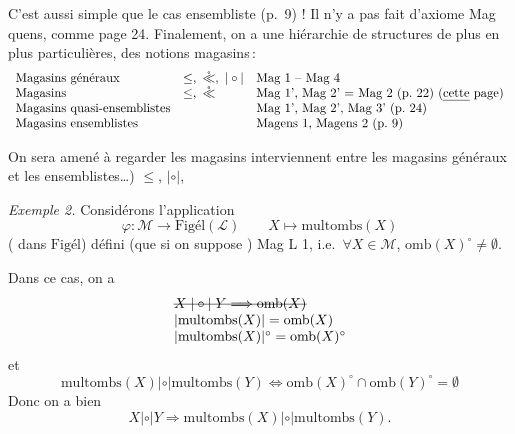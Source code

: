 \documentclass[11pt,a4paper]{article}
\begin{document}
C'est  aussi simple que le cas ensembliste (p.~9) ! Il
n'y a pas    fait d'axiome
Mag quens, comme page 24. Finalement, on a une hiérarchie de structures de plus en
plus particulières, des notions  magasins\,:
\[
  \begin{array}{lll}
    \text{Magasins généraux} & \leq,\ \mathring{\ll},\ |\circ| & \text{Mag 1 -- Mag 4} \\
    \text{Magasins} & \leq,\ \mathring{\ll} & \text{Mag 1', Mag 2' = Mag 2}
      \ (\text{p.~22}) \ (\text{\uncertain{cette} page}) \\
    \text{Magasins quasi-ensemblistes} & & \text{Mag 1', Mag 2', Mag 3'} \ (\text{p.~24}) \\
    \text{Magasins ensemblistes} & & \text{Magens 1, Magens 2} \ (\text{p.~9})
  \end{array}
\]

On sera amené  à regarder les magasins
   interviennent
entre les magasins généraux et les ensemblistes…)  
$\leq$, $|\circ|$, \ill{}

\emph{Exemple 2.} Considérons l'application
\[
  \varphi : \mathcal{M} \longrightarrow \text{Figél}(\mathcal{L}) \qquad
  X \longmapsto \mathrm{multombs}(X)
\]
 ( \ill{}  
dans $\text{Figél}$)   défini (que si on suppose
) Mag L 1, i.e.\ $\forall X \in \mathcal{M}$,
$\mathrm{omb}(X)^{\circ} \neq \emptyset$.

Dans ce cas, on a 
\[
  \begin{array}{l}
    \text{\struck{$X \mathrel{|\circ|} Y \Longrightarrow \mathrm{omb}(X)$}} \\
    |\mathrm{multombs}(X)| = \mathrm{omb}(X) \\
    |\mathrm{multombs}(X)|^{\circ} = \mathrm{omb}(X)^{\circ}
  \end{array}
\]
et
\[
  \mathrm{multombs}(X) \mathrel{|\circ|} \mathrm{multombs}(Y)
  \Longleftrightarrow \mathrm{omb}(X)^{\circ} \cap \mathrm{omb}(Y)^{\circ} = \emptyset
\]
Donc on a bien
\[
  X \mathrel{|\circ|} Y \Longrightarrow \mathrm{multombs}(X) \mathrel{|\circ|}
  \mathrm{multombs}(Y) .
\]
\end{document}
